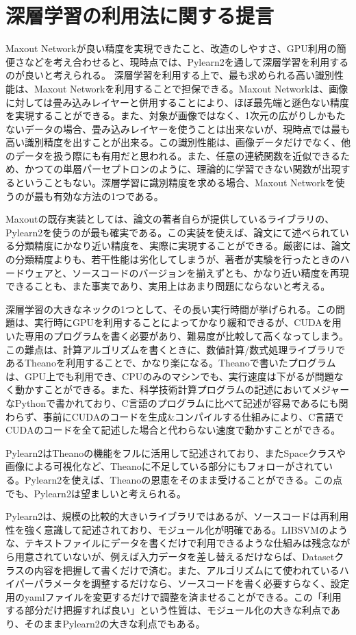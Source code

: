 \section{深層学習の利用法に関する提言}
Maxout Networkが良い精度を実現できたこと、改造のしやすさ、GPU利用の簡便さなどを考え合わせると、現時点では、Pylearn2を通して深層学習を利用するのが良いと考えられる。
深層学習を利用する上で、最も求められる高い識別性能は、Maxout Networkを利用することで担保できる。Maxout Networkは、画像に対しては畳み込みレイヤーと併用することにより、ほぼ最先端と遜色ない精度を実現することができる。また、対象が画像ではなく、1次元の広がりしかもたないデータの場合、畳み込みレイヤーを使うことは出来ないが、現時点では最も高い識別精度を出すことが出来る。この識別性能は、画像データだけでなく、他のデータを扱う際にも有用だと思われる。また、任意の連続関数を近似できるため、かつての単層パーセプトロンのように、理論的に学習できない関数が出現するということもない。深層学習に識別精度を求める場合、Maxout Networkを使うのが最も有効な方法の1つである。\par
Maxoutの既存実装としては、論文の著者自らが提供しているライブラリの、Pylearn2を使うのが最も確実である。この実装を使えば、論文にて述べられている分類精度にかなり近い精度を、実際に実現することができる。厳密には、論文の分類精度よりも、若干性能は劣化してしまうが、著者が実験を行ったときのハードウェアと、ソースコードのバージョンを揃えずとも、かなり近い精度を再現できることも、また事実であり、実用上はあまり問題にならないと考える。\par
深層学習の大きなネックの1つとして、その長い実行時間が挙げられる。この問題は、実行時にGPUを利用することによってかなり緩和できるが、CUDAを用いた専用のプログラムを書く必要があり、難易度が比較して高くなってしまう。この難点は、計算アルゴリズムを書くときに、数値計算/数式処理ライブラリであるTheanoを利用することで、かなり楽になる。Theanoで書いたプログラムは、GPU上でも利用でき、CPUのみのマシンでも、実行速度は下がるが問題なく動かすことができる。また、科学技術計算プログラムの記述においてメジャーなPythonで書かれており、C言語のプログラムに比べて記述が容易であるにも関わらず、事前にCUDAのコードを生成\&コンパイルする仕組みにより、C言語でCUDAのコードを全て記述した場合と代わらない速度で動かすことができる。\par
Pylearn2はTheanoの機能をフルに活用して記述されており、またSpaceクラスや画像による可視化など、Theanoに不足している部分にもフォローがされている。Pylearn2を使えば、Theanoの恩恵をそのまま受けることができる。この点でも、Pylearn2は望ましいと考えられる。\par
Pylearn2は、規模の比較的大きいライブラリではあるが、ソースコードは再利用性を強く意識して記述されており、モジュール化が明確である。LIBSVMのような、テキストファイルにデータを書くだけで利用できるような仕組みは残念ながら用意されていないが、例えば入力データを差し替えるだけならば、Datasetクラスの内容を把握して書くだけで済む。また、アルゴリズムにて使われているハイパーパラメータを調整するだけなら、ソースコードを書く必要すらなく、設定用のyamlファイルを変更するだけで調整を済ませることができる。この「利用する部分だけ把握すれば良い」という性質は、モジュール化の大きな利点であり、そのままPylearn2の大きな利点でもある。